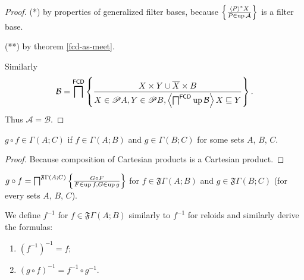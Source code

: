 \begin{proof}
({*}) by properties of generalized filter bases, because $\left\{ \frac{\left\langle P\right\rangle ^{\ast}X}{P\in\operatorname{up}\mathcal{A}}\right\}$
is a filter base.

({*}{*}) by theorem \ref{fcd-as-meet}.

Similarly 
\[
\mathcal{B}=\bigsqcap^{\mathsf{FCD}}\left\{ \frac{X\times Y\cup\overline{X}\times B}{X\in\mathscr{P} A,Y\in\mathscr{P} B,\left\langle \bigsqcap^{\mathsf{FCD}}\operatorname{up}\mathcal{B}\right\rangle X\sqsubseteq Y}\right\}.
\]
Thus $\mathcal{A}=\mathcal{B}$.\end{proof}
\begin{prop}
$g\circ f\in\Gamma(A;C)$ if $f\in\Gamma(A;B)$ and $g\in\Gamma(B;C)$
for some sets $A$, $B$, $C$.\end{prop}
\begin{proof}
Because composition of Cartesian products is a Cartesian product.\end{proof}
\begin{defn}
$g\circ f=\bigsqcap^{\mathfrak{F}\Gamma(A;C)}\left\{ \frac{G\circ F}{F\in\operatorname{up} f,G\in\operatorname{up} g}\right\}$
for $f\in\mathfrak{F}\Gamma(A;B)$ and $g\in\mathfrak{F}\Gamma(B;C)$
(for every sets $A$, $B$, $C$).
\end{defn}
We define $f^{-1}$ for $f\in\mathfrak{F}\Gamma(A;B)$ similarly to
$f^{-1}$ for reloids and similarly derive the formulas:
\begin{enumerate}
\item $(f^{-1})^{-1}=f$;
\item $(g\circ f)^{-1}=f^{-1}\circ g^{-1}$.
\end{enumerate}

